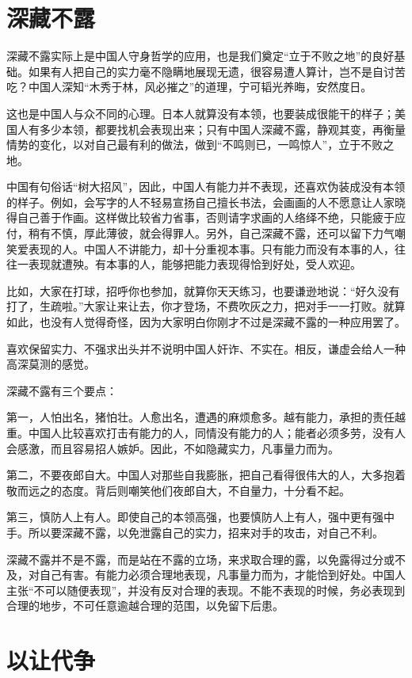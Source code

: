 \documentclass[fontset=fandol, a4paper, 12pt, openright]{ctexbook}
\begin{document}
\section{深藏不露}

深藏不露实际上是中国人守身哲学的应用，也是我们奠定“立于不败之地”的良好基础。如果有人把自己的实力毫不隐瞒地展现无遗，很容易遭人算计，岂不是自讨苦吃？中国人深知“木秀于林，风必摧之”的道理，宁可韬光养晦，安然度日。

这也是中国人与众不同的心理。日本人就算没有本领，也要装成很能干的样子；美国人有多少本领，都要找机会表现出来；只有中国人深藏不露，静观其变，再衡量情势的变化，以对自己最有利的做法，做到“不鸣则已，一鸣惊人”，立于不败之地。

中国有句俗话“树大招风”，因此，中国人有能力并不表现，还喜欢伪装成没有本领的样子。例如，会写字的人不轻易宣扬自己擅长书法，会画画的人不愿意让人家晓得自己善于作画。这样做比较省力省事，否则请字求画的人络绎不绝，只能疲于应付，稍有不慎，厚此薄彼，就会得罪人。另外，自己深藏不露，还可以留下力气嘲笑爱表现的人。中国人不讲能力，却十分重视本事。只有能力而没有本事的人，往往一表现就遭殃。有本事的人，能够把能力表现得恰到好处，受人欢迎。

比如，大家在打球，招呼你也参加，就算你天天练习，也要谦逊地说：“好久没有打了，生疏啦。”大家让来让去，你才登场，不费吹灰之力，把对手一一打败。就算如此，也没有人觉得奇怪，因为大家明白你刚才不过是深藏不露的一种应用罢了。

喜欢保留实力、不强求出头并不说明中国人奸诈、不实在。相反，谦虚会给人一种高深莫测的感觉。

深藏不露有三个要点：

第一，人怕出名，猪怕壮。人愈出名，遭遇的麻烦愈多。越有能力，承担的责任越重。中国人比较喜欢打击有能力的人，同情没有能力的人；能者必须多劳，没有人会感激，而且容易招人嫉妒。因此，不如隐藏实力，凡事量力而为。

第二，不要夜郎自大。中国人对那些自我膨胀，把自己看得很伟大的人，大多抱着敬而远之的态度。背后则嘲笑他们夜郎自大，不自量力，十分看不起。

第三，慎防人上有人。即使自己的本领高强，也要慎防人上有人，强中更有强中手。所以要深藏不露，以免泄露自己的实力，招来对手的攻击，对自己不利。

深藏不露并不是不露，而是站在不露的立场，来求取合理的露，以免露得过分或不及，对自己有害。有能力必须合理地表现，凡事量力而为，才能恰到好处。中国人主张“不可以随便表现”，并没有反对合理的表现。不能不表现的时候，务必表现到合理的地步，不可任意逾越合理的范围，以免留下后患。

\section{以让代争}
\end{document}

